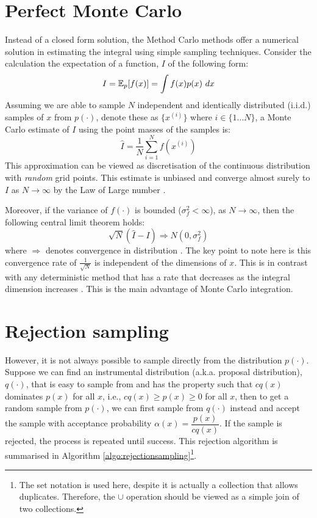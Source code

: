 \section{Perfect Monte Carlo}
Instead of a closed form solution, the Method Carlo methods offer a numerical solution in estimating the integral using simple sampling techniques. Consider the calculation the expectation of a function, $I$ of the following form:
\begin{equation}
  I = \operatorname{\mathbb{E}}_p[f(x)] = \int f(x)p(x)~dx
\label{eq:expectation}
\end{equation}
Assuming we are able to sample $N$ independent and identically distributed (i.i.d.) samples of $x$ from $p(\cdot)$, denote these as $\{x^{(i)}\}$ where $i \in \{1 \ldots N\}$, a Monte Carlo estimate of $I$ using the point masses of the samples is:
\begin{equation}
  \hat{I} = \frac{1}{N} \sum^N_{i=1} f(x^{(i)})
\end{equation}
This approximation can be viewed as discretisation of the continuous distribution with \emph{random} grid points. This estimate is unbiased and converge almost surely to $I$ as $N \to \infty$ by the Law of Large number \cite{RCP05}. 

Moreover, if the variance of $f(\cdot)$ is bounded ($\sigma^2_f < \infty$), as $N \to \infty$, then the following central limit theorem holds:
\begin{equation}
  \sqrt{N}(\hat{I} - I) \Longrightarrow N(0, \sigma^2_f)
\end{equation}
where $\Longrightarrow$ denotes convergence in distribution \cite{AD09}. The key point to note here is this convergence rate of $\frac{1}{\sqrt{N}}$ is independent of the dimensions of $x$. This is in contrast with any deterministic method that has a rate that decreases as the integral dimension increases \cite{RCP05}. This is the main advantage of Monte Carlo integration.

\section{Rejection sampling}
However, it is not always possible to sample directly from the distribution $p(\cdot)$. Suppose we can find an instrumental distribution (a.k.a. proposal distribution), $q(\cdot)$, that is easy to sample from and has the property such that $cq(x)$ dominates $p(x)$ for all $x$, i.e., $cq(x) \geq p(x) \geq 0$ for all $x$, then to get a random sample from $p(\cdot)$, we can first sample from $q(\cdot)$ instead and accept the sample with acceptance probability $\alpha(x)=\dfrac{p(x)}{cq(x)}$. If the sample is rejected, the process is repeated until success. This rejection algorithm is summarised in Algorithm \ref{algo:rejectionsampling}\footnote{The set notation is used here, despite it is actually a collection that allows duplicates. Therefore, the $\cup$ operation should be viewed as a simple join of two collections.}.

